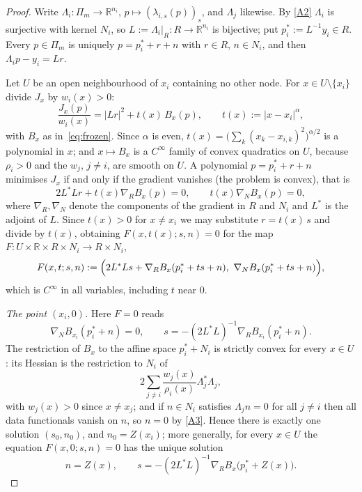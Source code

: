 \documentclass[12pt]{amsart}
\theoremstyle{definition}
\theoremstyle{remark}
\newcommand{\R}{\mathbb{R}}
\newcommand{\Pm}{\Pi_m}
\begin{document}
\begin{proof}
Write $\Lambda_i:\Pm\to\R^{n_i}$, $p\mapsto(\lambda_{i,s}(p))_s$, and $\Lambda_j$ likewise. By
\ref{A2} $\Lambda_i$ is surjective with kernel $N_i$, so $L:=\Lambda_i|_R:R\to\R^{n_i}$ is
bijective; put $p_i^*:=L^{-1}y_i\in R$. Every $p\in\Pm$ is uniquely $p=p_i^*+r+n$ with $r\in
R$, $n\in N_i$, and then $\Lambda_ip-y_i=Lr$.

Let $U$ be an open neighbourhood of $x_i$ containing no other node. For $x\in U\setminus\{x_i\}$
divide $J_x$ by $w_i(x)>0$:
\[
  \frac{J_x(p)}{w_i(x)}=|Lr|^2+t(x)\,B_x(p),\qquad t(x):=|x-x_i|^{\alpha},
\]
with $B_x$ as in~\eqref{eq:frozen}. Since $\alpha$ is even,
$t(x)=\bigl(\sum_k(x_k-x_{i,k})^2\bigr)^{\alpha/2}$ is a polynomial in $x$; and $x\mapsto B_x$
is a $C^\infty$ family of convex quadratics on $U$, because $\rho_i>0$ and the $w_j$, $j\ne i$,
are smooth on $U$. A polynomial $p=p_i^*+r+n$ minimises $J_x$ if and only if the gradient
vanishes (the problem is convex), that is
\[
  2L^*Lr+t(x)\nabla_RB_x(p)=0,\qquad t(x)\nabla_NB_x(p)=0,
\]
where $\nabla_R,\nabla_N$ denote the components of the gradient in $R$ and $N_i$ and $L^*$ is
the adjoint of $L$. Since $t(x)>0$ for $x\ne x_i$ we may substitute $r=t(x)\,s$ and divide by
$t(x)$, obtaining $F(x,t(x);s,n)=0$ for the map $F:U\times\R\times R\times N_i\to R\times N_i$,
\[
  F(x,t;s,n):=\Bigl(2L^*Ls+\nabla_RB_x(p_i^*+ts+n),\ \nabla_NB_x(p_i^*+ts+n)\Bigr),
\]
which is $C^\infty$ in all variables, including $t$ near $0$.

\emph{The point $(x_i,0)$.} Here $F=0$ reads
\[
  \nabla_NB_{x_i}(p_i^*+n)=0,\qquad s=-(2L^*L)^{-1}\nabla_RB_{x_i}(p_i^*+n).
\] The restriction of $B_x$ to the affine space
$p_i^*+N_i$ is strictly convex for every $x\in U$: its Hessian is the restriction to $N_i$ of
\[
  2\sum_{j\ne i}\frac{w_j(x)}{\rho_i(x)}\Lambda_j^*\Lambda_j ,
\]
with
$w_j(x)>0$ since $x\ne x_j$; and if $n\in N_i$ satisfies $\Lambda_jn=0$ for all $j\ne i$ then
all data functionals vanish on $n$, so $n=0$ by \ref{A3}. Hence there is exactly one solution
$(s_0,n_0)$, and $n_0=Z(x_i)$; more generally, for every $x\in U$ the equation
$F(x,0;s,n)=0$ has the unique solution
\[
  n=Z(x),\qquad s=-(2L^*L)^{-1}\nabla_RB_x\bigl(p_i^*+Z(x)\bigr).
\]


\end{proof}
\end{document}
